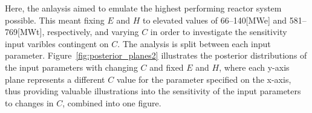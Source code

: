 \documentclass[journal]{IEEEtran}
\begin{document}







Here, the anlaysis aimed to emulate the highest performing reactor system possible. This meant fixing $E$ and $H$ to elevated values of 66--140[MWe] and 581--769[MWt], respectively, and varying $C$ in order to investigate the sensitivity input varibles contingent on $C$. The analysis is split between each input parameter. Figure~\ref{fig:posterior_planes2} illustrates the posterior distributions of the input parameters with changing $C$ and fixed $E$ and $H$, where each y-axis plane represents a different $C$ value for the parameter specified on the x-axis, thus providing valuable illustrations into the sensitivity of the input parameters to changes in $C$, combined into one figure. 
\end{document}
